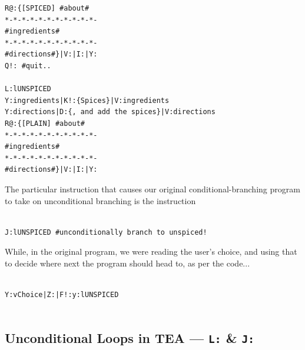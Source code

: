 \documentclass[a4paper, 18pt]{book} %
\begin{document}
{{{\begin{appendices}
\begin{tcolorbox}[teaterminalstyle, title=Unconditional Branching in TEA: MILK TEA RECIPE Presenter, breakable]
\begin{lstlisting}[language=TEA,breaklines=true,]
R@:{[SPICED] #about#
*-*-*-*-*-*-*-*-*-*-*-
#ingredients#
*-*-*-*-*-*-*-*-*-*-*-
#directions#}|V:|I:|Y:
Q!: #quit..

L:lUNSPICED
Y:ingredients|K!:{Spices}|V:ingredients
Y:directions|D:{, and add the spices}|V:directions
R@:{[PLAIN] #about#
*-*-*-*-*-*-*-*-*-*-*-
#ingredients#
*-*-*-*-*-*-*-*-*-*-*-
#directions#}|V:|I:|Y:
       \end{lstlisting}
      \end{tcolorbox}
    
    \vspace{2em}
    
    

The particular instruction that causes our original conditional-branching program to take on unconditional branching is the instruction 


      \begin{tcolorbox}[teaterminalstyle,]
      \begin{lstlisting}[language=TEA,breaklines=true,]
      
J:lUNSPICED #unconditionally branch to unspiced!

       \end{lstlisting}
      \end{tcolorbox}
    
    \vspace{2em}
    
   While, in the original program, we were reading the user's choice, and using that to decide where next the program should head to, as per the code...
   
   
         \begin{tcolorbox}[teaterminalstyle,]
         \begin{lstlisting}[language=TEA,breaklines=true,]
         
Y:vChoice|Z:|F!:y:lUNSPICED
   
          \end{lstlisting}
         \end{tcolorbox}



\subsection{Unconditional Loops in TEA --- \texttt{L:} \& \texttt{J:}}
\label{LEARNTEATOPICCF_UNCON_LOO}



\end{appendices}}}}
\end{document}
